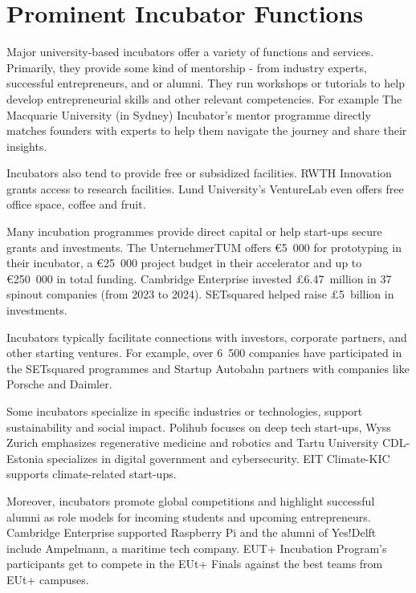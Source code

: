 \section{Prominent Incubator Functions}
Major university-based incubators offer a variety of functions and services. Primarily, they provide some kind of mentorship - from industry experts, successful entrepreneurs, and or alumni. They run workshops or tutorials to help develop entrepreneurial skills and other relevant competencies. For example The Macquarie University (in Sydney) Incubator’s mentor programme directly matches founders with experts to help them navigate the journey and share their insights.

Incubators also tend to provide free or subsidized facilities. RWTH Innovation grants access to research facilities. Lund University’s VentureLab even offers free office space, coffee and fruit.

Many incubation programmes provide direct capital or help start-ups secure grants and investments. The UnternehmerTUM offers €5~000 for prototyping in their incubator, a €25~000 project budget in their accelerator and up to €250~000 in total funding. Cambridge Enterprise invested £6.47~million in 37 spinout companies (from 2023 to 2024). SETsquared helped raise £5~billion in investments.

Incubators typically facilitate connections with investors, corporate partners, and other starting ventures. For example, over 6~500 companies have participated in the SETsquared programmes and Startup Autobahn partners with companies like Porsche and Daimler.

Some incubators specialize in specific industries or technologies, support sustainability and social impact. Polihub focuses on deep tech start-ups, Wyss Zurich emphasizes regenerative medicine and robotics and Tartu University CDL-Estonia specializes in digital government and cybersecurity. EIT Climate-KIC supports climate-related start-ups.

Moreover, incubators promote global competitions and highlight successful alumni as role models for incoming students and upcoming entrepreneurs. Cambridge Enterprise supported Raspberry Pi and the alumni of Yes!Delft include Ampelmann, a maritime tech company. EUT+ Incubation Program’s participants get to compete in the EUt+ Finals against the best teams from EUt+ campuses.

